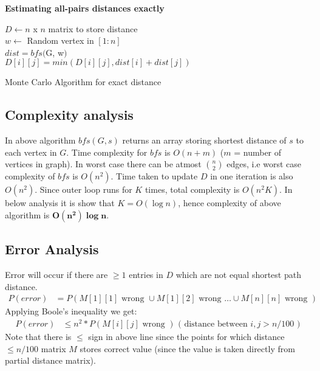 \documentclass[a4paper]{article}
\newcommand{\V}[1]{\boldsymbol{#1}}
\begin{document}
\begin{question}
\textbf{Estimating all-pairs distances exactly}
\end{question}
\begin{algorithm}[H]
\SetAlgoLined
{}
 $D \leftarrow n$ x $n$ matrix to store distance \\ 
  {
 	 {
 	}
 }
  {
 	$w \leftarrow$ Random vertex in $[1:n]$ \\
 	$dist = bfs($G, w$)$ \\
 	 {
 		 {
 		    $D[i][j] = min(D[i][j], dist[i] + dist[j])$
 		}
 	}
 }

 \caption{Monte Carlo Algorithm for exact distance}
\end{algorithm}
\subsection*{Complexity analysis}
In above algorithm $bfs(G, s)$ returns an array storing shortest distance of $s$ to each vertex in $G$.
Time complexity for $bfs$ is $O(n + m)$ ($m$ = number of vertices in graph).
In worst case there can be atmost $n \choose 2$ edges, i.e worst case complexity of $bfs$ is $O(n^2)$. Time taken to update $D$ in one iteration is also $O(n^2)$.
Since outer loop runs for $K$ times, total complexity is $O(n^2K)$.
In below analysis it is show that $K = O(\log n)$, hence complexity of above algorithm is $\V{O(n^2)\log n}$.

\subsection*{Error Analysis}

Error will occur if there are $\geq 1$ entries in $D$ which are not equal shortest path distance.
\begin{align*}
P(error) &= P(M[1][1] \text{ wrong } \cup M[1][2] \text{ wrong } \ldots \cup M[n][n]\text{ wrong })
\end{align*}
Applying Boole's inequality we get:
\begin{align*}
P(error) &\leq n^2*P(M[i][j] \text{ wrong }) \text{ ( distance between $i,j > n/100$ )}
\end{align*}
Note that there is $\leq$ sign in above line since the points for which distance $\leq n/100$ matrix $M$ stores correct value (since the value is taken directly from partial distance matrix).
\end{document}
